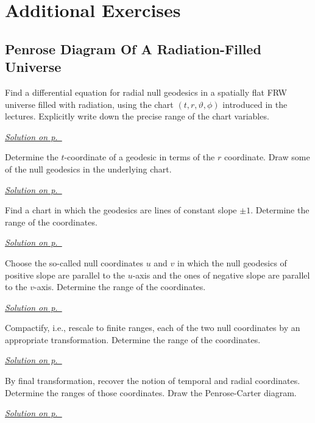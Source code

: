 \section{Additional Exercises}

\subsection{Penrose Diagram Of A Radiation-Filled Universe}

\begin{exercise}\label{ex:diagrams-1}
Find a differential equation for radial null geodesics in a spatially flat FRW universe filled with radiation, using the chart $(t,r,\vartheta,\phi)$ introduced in the lectures. Explicitly write down the precise range of the chart variables.
\end{exercise}
\hyperref[sol:diagrams-1]{\small \textit{Solution on p.~\pageref*{sol:diagrams-1}}}

\begin{exercise}\label{ex:diagrams-2}
Determine the $t$-coordinate of a geodesic in terms of the $r$ coordinate. Draw some of the null geodesics in the underlying chart.
\end{exercise}
\hyperref[sol:diagrams-2]{\small \textit{Solution on p.~\pageref*{sol:diagrams-2}}}

\begin{exercise}\label{ex:diagrams-3}
Find a chart in which the geodesics are lines of constant slope $\pm1$. Determine the range of the coordinates.
\end{exercise}
\hyperref[sol:diagrams-3]{\small \textit{Solution on p.~\pageref*{sol:diagrams-3}}}

\begin{exercise}\label{ex:diagrams-4}
Choose the so-called null coordinates $u$ and $v$ in which the null geodesics of positive slope are parallel to the $u$-axis and the ones of negative slope are parallel to the $v$-axis. Determine the range of the coordinates.
\end{exercise}
\hyperref[sol:diagrams-4]{\small \textit{Solution on p.~\pageref*{sol:diagrams-4}}}

\begin{exercise}\label{ex:diagrams-5}
Compactify, i.e., rescale to finite ranges, each of the two null coordinates by an appropriate transformation. Determine the range of the coordinates.
\end{exercise}
\hyperref[sol:diagrams-5]{\small \textit{Solution on p.~\pageref*{sol:diagrams-5}}}

\begin{exercise}\label{ex:diagrams-6}
By final transformation, recover the notion of temporal and radial coordinates. Determine the ranges of those coordinates. Draw the Penrose-Carter diagram.
\end{exercise}
\hyperref[sol:diagrams-6]{\small \textit{Solution on p.~\pageref*{sol:diagrams-6}}}
